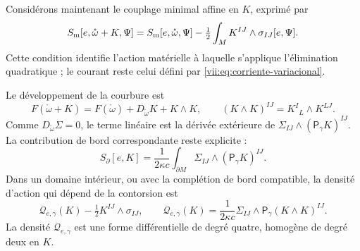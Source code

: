 Considérons maintenant le couplage minimal affine en \(K\), exprimé par
\begin{equation}
 S_{\rm m}[e,\mathring\omega+K,\Psi]
 =S_{\rm m}[e,\mathring\omega,\Psi]
   -\tfrac12\int_M K^{IJ}\wedge\sigma_{IJ}[e,\Psi].
 \label{vii:eq:materia-afin-contorsion}
\end{equation}
Cette condition identifie l'action matérielle à laquelle s'applique
l'élimination quadratique ; le courant reste celui défini par
\eqref{vii:eq:corriente-variacional}.

Le développement de la courbure est
\begin{equation}
 F(\mathring\omega+K)
 =F(\mathring\omega)+D_{\mathring\omega}K+K\wedge K,
 \qquad (K\wedge K)^{IJ}=K^I{}_{L}\wedge K^{LJ}.
 \label{vii:eq:curvatura-contorsion}
\end{equation}
Comme \(D_{\mathring\omega}\Sigma=0\), le terme linéaire est la
dérivée extérieure de \(\Sigma_{IJ}\wedge(\mathsf P_\gamma K)^{IJ}\).
La contribution de bord correspondante reste explicite :
\begin{equation}
 S_\partial[e,K]=\frac1{2\kappa c}
     \int_{\partial M}\Sigma_{IJ}\wedge(\mathsf P_\gamma K)^{IJ}.
 \label{vii:eq:borde-contorsion}
\end{equation}
Dans un domaine intérieur, ou avec la complétion de bord compatible,
la densité d'action qui dépend de la contorsion est
\begin{equation}
 \mathcal Q_{e,\gamma}(K)-\tfrac12K^{IJ}\wedge\sigma_{IJ},
 \qquad
 \mathcal Q_{e,\gamma}(K)
  =\frac1{2\kappa c}\Sigma_{IJ}\wedge
                         \mathsf P_\gamma(K\wedge K)^{IJ}.
 \label{vii:eq:forma-cuadratica-contorsion}
\end{equation}
La densité \(\mathcal Q_{e,\gamma}\) est une forme différentielle de
degré quatre, homogène de degré deux en \(K\).

